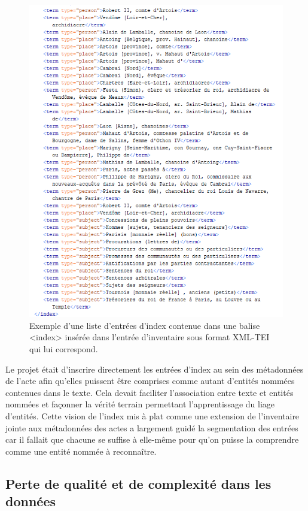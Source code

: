 \documentclass[a4paper,12pt,twoside]{book}
\begin{document}
	\begin{figure}
		\centering
		\includegraphics[width=\textwidth]{Images/Index_in_inventaire.png}
		\caption{Exemple d'une liste d'entrées d'index contenue dans une balise <index> insérée dans l'entrée d'inventaire sous format XML-TEI qui lui correspond.}
		\label{index_in_inventaire}
	\end{figure}
	
	Le projet était d'inscrire directement les entrées d'index au sein des métadonnées de l'acte afin qu'elles puissent être comprises comme autant d'entités nommées contenues dans le texte. Cela devait faciliter l'association entre texte et entités nommées et façonner la vérité terrain permettant l'apprentissage du liage d'entités. Cette vision de l'index mis à plat comme une extension de l'inventaire jointe aux métadonnées des actes a largement guidé la segmentation des entrées car il fallait que chacune se suffise à elle-même pour qu'on puisse la comprendre comme une entité nommée à reconnaître.
	
	\subsection{Perte de qualité et de complexité dans les données}
	
\end{document}
